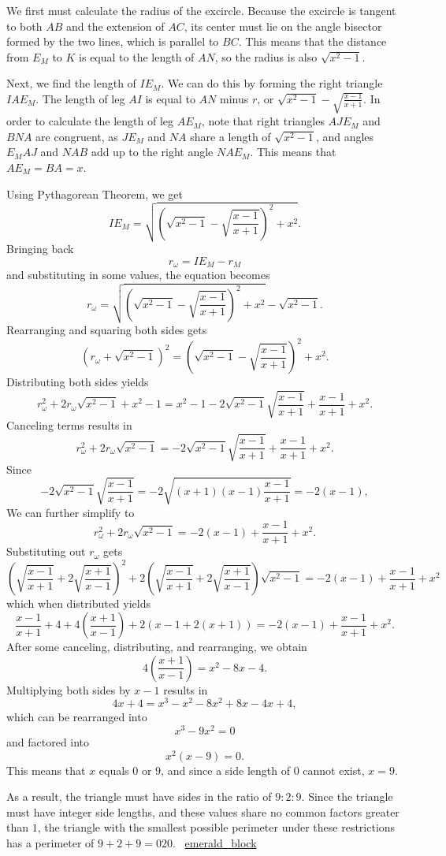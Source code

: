 \begin{enumerate}
 We first must calculate the radius of the excircle. Because the excircle is tangent to both $AB$ and the extension of $AC$, its center must lie on the angle bisector formed by the two lines, which is parallel to $BC$. This means that the distance from $E_M$ to $K$ is equal to the length of $AN$, so the radius is also $\sqrt{x^2-1}$.

 Next, we find the length of $IE_M$. We can do this by forming the right triangle $IAE_M$. The length of leg $AI$ is equal to $AN$ minus $r$, or $\sqrt{x^2-1}-\sqrt{\frac{x-1}{x+1}}$. In order to calculate the length of leg $AE_M$, note that right triangles $AJE_M$ and $BNA$ are congruent, as $JE_M$ and $NA$ share a length of $\sqrt{x^2-1}$, and angles $E_MAJ$ and $NAB$ add up to the right angle $NAE_M$. This means that $AE_M=BA=x$.

 Using Pythagorean Theorem, we get
 \[IE_M=\sqrt{\left(\sqrt{x^2-1}-\sqrt{\frac{x-1}{x+1}}\right)^2+x^2}.\]Bringing back
 \[r_\omega=IE_M-r_M\]and substituting in some values, the equation becomes
 \[r_\omega=\sqrt{\left(\sqrt{x^2-1}-\sqrt{\frac{x-1}{x+1}}\right)^2+x^2}-\sqrt{x^2-1}.\]Rearranging and squaring both sides gets
 \[\left(r_\omega+\sqrt{x^2-1}\right)^2=\left(\sqrt{x^2-1}-\sqrt{\frac{x-1}{x+1}}\right)^2+x^2.\]Distributing both sides yields
 \[r_\omega^2+2r_\omega\sqrt{x^2-1}+x^2-1=x^2-1-2\sqrt{x^2-1}\sqrt{\frac{x-1}{x+1}}+\frac{x-1}{x+1}+x^2.\]Canceling terms results in
 \[r_\omega^2+2r_\omega\sqrt{x^2-1}=-2\sqrt{x^2-1}\sqrt{\frac{x-1}{x+1}}+\frac{x-1}{x+1}+x^2.\]Since
 \[-2\sqrt{x^2-1}\sqrt{\frac{x-1}{x+1}}=-2\sqrt{(x+1)(x-1)\frac{x-1}{x+1}}=-2(x-1),\]We can further simplify to
 \[r_\omega^2+2r_\omega\sqrt{x^2-1}=-2(x-1)+\frac{x-1}{x+1}+x^2.\]Substituting out $r_\omega$ gets
 \[\left(\sqrt{\frac{x-1}{x+1}}+2\sqrt{\frac{x+1}{x-1}}\right)^2+2\left(\sqrt{\frac{x-1}{x+1}}+2\sqrt{\frac{x+1}{x-1}}\right)\sqrt{x^2-1}=-2(x-1)+\frac{x-1}{x+1}+x^2\]which when distributed yields
 \[\frac{x-1}{x+1}+4+4\left(\frac{x+1}{x-1}\right)+2(x-1+2(x+1))=-2(x-1)+\frac{x-1}{x+1}+x^2.\]After some canceling, distributing, and rearranging, we obtain
 \[4\left(\frac{x+1}{x-1}\right)=x^2-8x-4.\]Multiplying both sides by $x-1$ results in
 \[4x+4=x^3-x^2-8x^2+8x-4x+4,\]which can be rearranged into
 \[x^3-9x^2=0\]and factored into
 \[x^2(x-9)=0.\]This means that $x$ equals $0$ or $9$, and since a side length of $0$ cannot exist, $x=9$.

 
As a result, the triangle must have sides in the ratio of $9:2:9$. Since the triangle must have integer side lengths, and these values share no common factors greater than $1$, the triangle with the smallest possible perimeter under these restrictions has a perimeter of $9+2+9=\boxed{020}$. ~\href{https://artofproblemsolving.com/wiki/index.php?title=User:Emerald\_block}{emerald\_block}


\end{enumerate}
